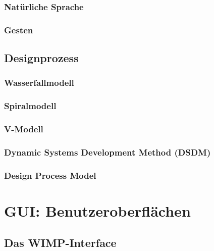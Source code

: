 \documentclass[a4paper, 11pt, accentcolor = tud3b]{tudreport}
\begin{document}
				\subsubsection{Natürliche Sprache} %

				\subsubsection{Gesten} %

			\subsection{Designprozess} %

				\subsubsection{Wasserfallmodell} %

				\subsubsection{Spiralmodell} %

				\subsubsection{V-Modell} %

				\subsubsection{Dynamic Systems Development Method (DSDM)} %

				\subsubsection{Design Process Model} %

		\section{GUI: Benutzeroberflächen} %

			\subsection{Das WIMP-Interface} %
\end{document}
